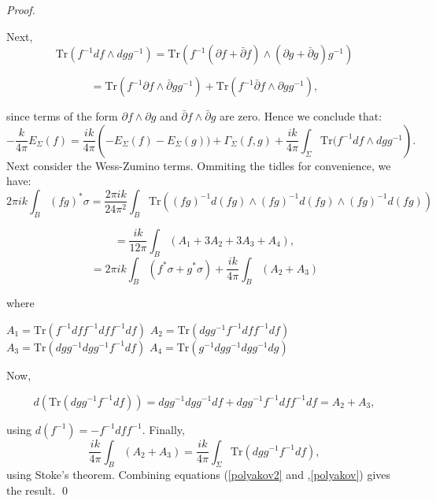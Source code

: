\begin{proof}
\begin{flushright}
\end{flushright}
Next, 
\begin{equation*}
\mathrm{Tr}\left(f^{-1} df \wedge d g g^{-1} \right) = \mathrm{Tr} 
\left( f^{-1} 
 (\partial f + \bar{\partial} f) 
 \wedge(\partial g + \bar{\partial} g ) g^{-1} \right)
\end{equation*}
\begin{flushright}
 \begin{equation*}
 = \mathrm{Tr} (f^{-1} \partial f \wedge \bar{\partial} g g^{-1}) + \mathrm{Tr}(f^{-1}
  \bar{\partial} f \wedge \partial g g^{-1} ),
 \end{equation*}
\end{flushright}
since terms of the form $\partial f \wedge \partial g $ and $\bar{\partial}f \wedge \bar{\partial} g$ are zero. 
Hence we
conclude that:
\begin{equation}\label{polyakov}
 -\dfrac{k}{4 \pi} E_{\Sigma}(f) = \dfrac{ik}{4 \pi} \left( - E_{\Sigma}(f) - E_{\Sigma}(g)) +
 \Gamma_{\Sigma}(f,g) + \dfrac{ik}{4\pi} \int_{\Sigma} \mathrm{Tr}(f^{-1} df \wedge dg g^{-1} \right).
\end{equation}
Next consider the Wess-Zumino terms. Ommiting the tidles for convenience, we have: 
\begin{equation*}
 2\pi i k \int_{B} (fg)^{*}\sigma = \dfrac{2\pi i k}{24\pi^{2}} \int_{B} \mathrm{Tr}\left(\left(fg\right)^{-1}
 d\left(fg\right)
 \wedge \left(fg\right)^{-1}d\left(fg\right)\wedge \left(fg\right)^{-1}d\left(fg\right)\right)
\end{equation*}
 \begin{flushright}
  \begin{equation*}
   = \dfrac{ik}{12\pi} \int_{B} \left(A_1 + 3 A_2 + 3 A_3 + A_4 \right), 
  \end{equation*}
\begin{equation*}
 = 2\pi i k \int_{B} \left( f^{*} \sigma + g^{*} \sigma \right) + \dfrac{ik}{4 \pi} \int_{B} (A_2 + A_3)
\end{equation*}
 \end{flushright}
where 
\begin{flushright}
       $A_1= \mathrm{Tr}(f^{-1} df f^{-1} df f^{-1} df )$
     $A_2 = \mathrm{Tr}\left( dg g^{-1} f^{-1} df f^{-1} df \right)$
        $A_3 = \mathrm{Tr}(dgg^{-1} dgg^{-1} f^{-1} df )$
        $A_4 = \mathrm{Tr}(g^{-1} dgg^{-1} dgg^{-1} dg)$
      \end{flushright}
Now, \begin{flushright}
\begin{equation*}
 d(\mathrm{Tr}(dgg^{-1}f^{-1} df)) = dgg^{-1} dgg^{-1} df + dgg^{-1} f^{-1} df f^{-1} df = A_2 + A_3,
\end{equation*}
\end{flushright}
 using $d(f^{-1}) = -f^{-1} df f^{-1}$. Finally,
 \begin{equation}\label{polyakov2}
  \dfrac{ik}{4\pi} \int_{B} (A_2 + A_3) = \dfrac{ik}{4\pi} \int_{\Sigma} \mathrm{Tr} (dgg^{-1} f^{-1} df),
 \end{equation}
using Stoke's theorem. Combining equations (\ref{polyakov2} and ,\ref{polyakov}) gives the result.
\qed
\end{proof}
